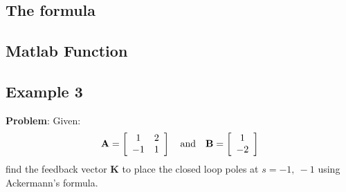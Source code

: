 \subsection*{The formula} %
\label{sub:the_formula}


\ifslidesonly
\begin{slide}
   
\end{slide}
\fi


\ifslidesonly
\begin{slide}
   
\end{slide}
\fi


\ifslidesonly
\begin{slide}
   
\end{slide}
\fi

\subsection*{Matlab Function}

\ifslidesonly
\begin{slide}
   
\end{slide}
\fi

 
\subsection*{Example 3} %
\label{ssec:example_2}

\textbf{Problem}: 
Given:
\[
{\bf{A}} = \left[ {\begin{array}{*{20}c}
   1 & 2  \\
   { - 1} & 1  \\
\end{array}} \right]\quad {\rm{and}}\quad {\bf{B}} = \left[ {\begin{array}{*{20}c}
   1  \\
   { - 2}  \\
\end{array}} \right]
\]
find the feedback vector $\mathbf{K}$ to place the closed loop poles at $s = −1,\ −1$ using Ackermann's formula.

